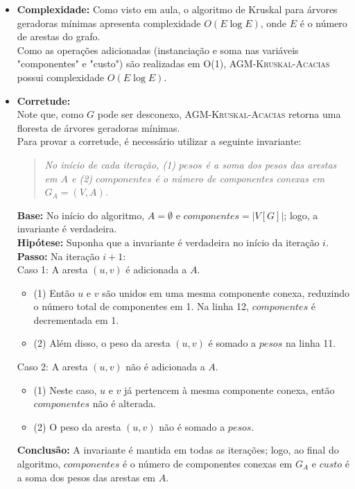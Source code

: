 \documentclass[
    12pt,
    a4paper,
    brazil,
    english
]{article}
\begin{document}
    \begin{itemize}
        \item \textbf{Complexidade:} Como visto em aula, o algoritmo de Kruskal para árvores geradoras mínimas apresenta complexidade $O(E \log E)$, onde $E$ é o número de arestas do grafo. \\
        Como as operações adicionadas (instanciação e soma nas variáveis "componentes" e "custo") são realizadas em O(1), \textsc{AGM-Kruskal-Acacias} possui complexidade $O(E \log E)$.
        \item \textbf{Corretude:} \\
        Note que, como $G$ pode ser desconexo, \textsc{AGM-Kruskal-Acacias} retorna uma floresta de árvores geradoras mínimas. \\
        Para provar a corretude, é necessário utilizar a seguinte invariante:
        \begin{quote}
            \textit{No início de cada iteração, (1) $pesos$ é a soma dos pesos das arestas em $A$ e (2) $componentes$ é o número de componentes conexas em $G_A = (V, A)$.}
        \end{quote}
        \textbf{Base:} No início do algoritmo, $A = \emptyset$ e $componentes = |V[G]|$; logo, a invariante é verdadeira. \\
        \textbf{Hipótese:} Suponha que a invariante é verdadeira no início da iteração $i$. \\
        \textbf{Passo:} Na iteração $i + 1$: \\
    Caso 1: A aresta $(u, v)$ é adicionada a $A$.
    \begin{itemize}
        \item (1) Então $u$ e $v$ são unidos em uma mesma componente conexa, reduzindo o número total de componentes em 1. Na linha 12, $componentes$ é decrementada em 1.
        \item (2) Além disso, o peso da aresta $(u, v)$ é somado a $pesos$ na linha 11.
    \end{itemize}
    Caso 2: A aresta $(u, v)$ não é adicionada a $A$.
    \begin{itemize}
        \item (1) Neste caso, $u$ e $v$ já pertencem à mesma componente conexa, então $componentes$ não é alterada.
        \item (2) O peso da aresta $(u, v)$ não é somado a $pesos$.
    \end{itemize}
    \textbf{Conclusão:} A invariante é mantida em todas as iterações; logo, ao final do algoritmo, $componentes$ é o número de componentes conexas em $G_A$ e $custo$ é a soma dos pesos das arestas em $A$.
\end{itemize}
\end{document}
